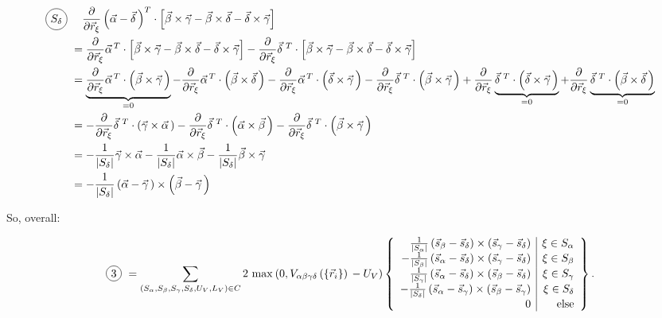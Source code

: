 \documentclass[a4paper]{article}
\newcommand*\circled[1]{
  \tikz[baseline=(char.base)]{
    \node[shape=circle,draw,inner sep=2pt] (char) {#1};
  }
}
\begin{document}
\begin{align}
  \text{\circled{$S_\delta$}} &\quad \partialPosVec{\xi}
    \vecDiff{\alpha}{\delta}^{T}
    \cdot \left[
      \vec{\beta} \times \vec{\gamma} - \vec{\beta} \times \vec{\delta} - \vec{\delta} \times \vec{\gamma} 
    \right] \\
  &= \partialPosVec{\xi} \vec{\alpha}^{\,T} \cdot \left[
      \vec{\beta} \times \vec{\gamma} - \vec{\beta} \times \vec{\delta} - \vec{\delta} \times \vec{\gamma} 
    \right] - \partialPosVec{\xi} \vec{\delta}^{\,\,T} \cdot \left[
      \vec{\beta} \times \vec{\gamma} - \vec{\beta} \times \vec{\delta} - \vec{\delta} \times \vec{\gamma}
    \right]\\
  &= \underbrace{
      \partialPosVec{\xi} \vec{\alpha}^{\,T} \cdot \vecCross{\beta}{\gamma}
    }_{=0} 
    - \partialPosVec{\xi} \vec{\alpha}^{\,T} \cdot \left( 
      \vec{\beta} \times \vec{\delta}\,
    \right)
    - \partialPosVec{\xi} \vec{\alpha}^{\,T} \cdot \vecCross{\delta}{\gamma}
    - \partialPosVec{\xi} \vec{\delta}^{\,\,T} \cdot \vecCross{\beta}{\gamma}
    + \partialPosVec{\xi} \underbrace{
      \vec{\delta}^{\,\,T} \cdot \vecCross{\delta}{\gamma} 
    }_{=0}
    + \partialPosVec{\xi} \underbrace{
      \vec{\delta}^{\,\,T} \cdot \vecCross{\beta}{\delta}
    }_{=0} \\
  &= - \partialPosVec{\xi} \vec{\delta}^{\,\,T} \cdot \vecCross{\gamma}{\alpha}
    - \partialPosVec{\xi} \vec{\delta}^{\,\,T} \cdot \vecCross{\alpha}{\beta}
    - \partialPosVec{\xi} \vec{\delta}^{\,\,T} \cdot \vecCross{\beta}{\gamma} \\
  &= - \frac{1}{|S_\delta|} \vec{\gamma} \times \vec{\alpha} -
  \frac{1}{|S_\delta|} \vec{\alpha} \times \vec{\beta} - \frac{1}{|S_\delta|} \vec{\beta} \times \vec{\gamma} \\
  &= - \frac{1}{|S_\delta|} \vecDiff{\alpha}{\gamma} \times \vecDiff{\beta}{\gamma} 
\end{align}

So, overall:

\begin{equation}
  \text{\circled{3}} = \chiralSum 2\ \chiralErrorFirstTerm{}  \left\{ \begin{array}{r | r}
    \frac{1}{|S_\alpha|} \avgVecDiff{\beta}{\delta} \times \avgVecDiff{\gamma}{\delta} & \xi \in S_\alpha\\
    - \frac{1}{|S_\beta|} \avgVecDiff{\alpha}{\delta} \times \avgVecDiff{\gamma}{\delta} & \xi \in S_\beta\\
    \frac{1}{|S_\gamma|} \avgVecDiff{\alpha}{\delta} \times \avgVecDiff{\beta}{\delta} & \xi \in S_\gamma\\
    - \frac{1}{|S_\delta|} \avgVecDiff{\alpha}{\gamma} \times \avgVecDiff{\beta}{\gamma} & \xi \in S_\delta\\
    0 & \textrm{else}
  \end{array} \right\}.
\end{equation}
\end{document}
